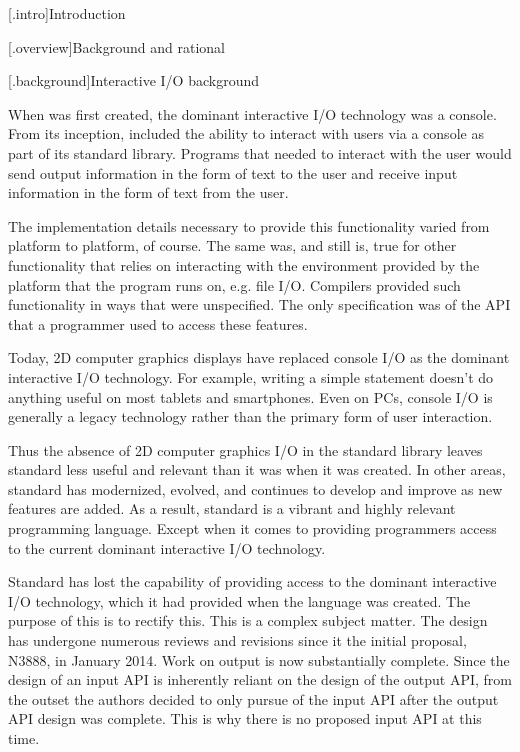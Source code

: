\addtocounter{chapter}{-1} %

[\iotwod.intro]{Introduction}

[\iotwod.overview]{Background and rational}

[\iotwod.background]{Interactive I/O background}

\pnum
When \Cpp{} was first created, the dominant interactive I/O technology was a console. From its inception, \Cpp{} included the ability to interact with users via a console as part of its standard library. Programs that needed to interact with the user would send output information in the form of text to the user and receive input information in the form of text from the user.

\pnum
The implementation details necessary to provide this functionality varied from platform to platform, of course. The same was, and still is, true for other functionality that relies on interacting with the environment provided by the platform that the program runs on, e.g. file I/O. Compilers provided such functionality in ways that were unspecified. The only specification was of the API that a programmer used to access these features.

\pnum
Today, 2D computer graphics displays have replaced console I/O as the dominant interactive I/O technology. For example, writing a simple  statement doesn’t do anything useful on most tablets and smartphones. Even on PCs, console I/O is generally a legacy technology rather than the primary form of user interaction.

\pnum
Thus the absence of 2D computer graphics I/O in the standard library leaves standard \Cpp{} less useful and relevant than it was when it was created. In other areas, standard \Cpp{} has modernized, evolved, and continues to develop and improve as new features are added. As a result, standard \Cpp{} is a vibrant and highly relevant programming language. Except when it comes to providing programmers access to the current dominant interactive I/O technology.

\pnum
Standard \Cpp{} has lost the capability of providing access to the dominant interactive I/O technology, which it had provided when the language was created. The purpose of this \documenttypename{} is to rectify this. This is a complex subject matter. The design has undergone numerous reviews and revisions since it the initial proposal, N3888, in January 2014. Work on output is now substantially complete. Since the design of an input API is inherently reliant on the design of the output API, from the outset the authors decided to only pursue of the input API after the output API design was complete. This is why there is no proposed input API at this time.

